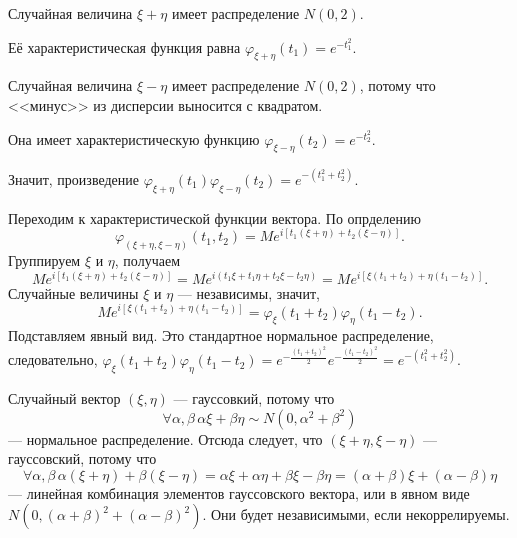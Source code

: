 Случайная величина $ \xi + \eta $ имеет распределение $N \left( 0, 2 \right) $.

Её характеристическая функция равна $ \varphi_{ \xi + \eta } \left( t_1 \right) = e^{-t_1^2}$.

Случайная величина $ \xi - \eta $ имеет распределение $N \left( 0, 2 \right) $,
потому что <<минус>> из дисперсии выносится с квадратом.

Она имеет характеристическую функцию $ \varphi_{ \xi - \eta } \left( t_2 \right) = e^{-t_2^2}$.

Значит,
произведение
$ \varphi_{ \xi + \eta } \left( t_1 \right) \varphi_{ \xi - \eta } \left( t_2 \right) =
  e^{- \left( t_1^2 + t_2^2 \right) }$.

Переходим к характеристической функции вектора.
По опрделению
$$ \varphi_{ \left( \xi + \eta, \xi - \eta \right) } \left( t_1, t_2 \right) =
  Me^{i \left[ t_1 \left( \xi + \eta \right) + t_2 \left( \xi - \eta \right) \right] }.$$
Группируем $ \xi $ и $ \eta $,
получаем
$$Me^{i \left[ t_1 \left( \xi + \eta \right) + t_2 \left( \xi - \eta \right) \right] } =
  Me^{i \left( t_1 \xi + t_1 \eta + t_2 \xi - t_2 \eta \right) } =
  Me^{i \left[ \xi \left( t_1 + t_2 \right) + \eta \left( t_1 - t_2 \right) \right] }.$$
Случайные величины $ \xi $ и $ \eta $ --- независимы, значит,
$$Me^{i \left[ \xi \left( t_1 + t_2 \right) + \eta \left( t_1 - t_2 \right) \right] } =
  \varphi_{ \xi } \left( t_1 + t_2 \right) \varphi_{ \eta} \left( t_1 - t_2 \right).$$
Подставляем явный вид.
Это стандартное нормальное распределение, следовательно,
$ \varphi_{ \xi } \left( t_1 + t_2 \right) \varphi_{ \eta} \left( t_1 - t_2 \right) =
  e^{- \frac{ \left( t_1 + t_2 \right)^2}{2}} e^{- \frac{ \left( t_1 - t_2 \right)^2}{2}} =
  e^{- \left( t_1^2 + t_2^2 \right) }$.

Случайный вектор $ \left( \xi, \eta \right) $ --- гауссовкий,
потому что
$$ \forall \alpha, \beta \,
  \alpha \xi + \beta \eta \sim N \left( 0, \alpha^2 + \beta^2 \right) $$
--- нормальное распределение.
Отсюда следует, что $ \left( \xi + \eta, \xi - \eta \right) $ --- гауссовский,
потому что
$$ \forall \alpha, \beta \,
  \alpha \left( \xi + \eta \right) + \beta \left( \xi - \eta \right) =
  \alpha \xi + \alpha \eta + \beta \xi - \beta \eta =
  \left( \alpha + \beta \right) \xi + \left( \alpha - \beta \right) \eta $$
--- линейная комбинация элементов гауссовского вектора,
или в явном виде
$N \left( 0, \left( \alpha + \beta \right)^2 + \left( \alpha - \beta \right)^2 \right) $.
Они будет независимыми, если некоррелируемы.

